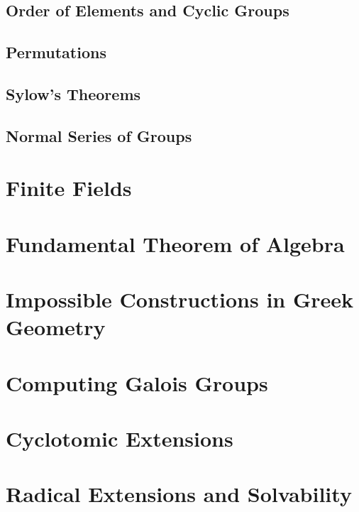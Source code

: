 \documentclass[oneside]{book}
\theoremstyle{lemmastyle}
\theoremstyle{definitionstyle}
\theoremstyle{exercisestyle}
\theoremstyle{claimstyle}
\newcommand{\<}{\langle}
\renewcommand{\>}{\rangle}
\begin{document}
        \section{Order of Elements and Cyclic Groups}
            
        
        \section{Permutations}
            
        
        \section{Sylow's Theorems}
            
            
        \section{Normal Series of Groups}
            
            
    \chapter{Finite Fields}
        
    
    \chapter{Fundamental Theorem of Algebra}
        
    
    \chapter{Impossible Constructions in Greek Geometry}
        
        
    \chapter{Computing Galois Groups}
        
    
    \chapter{Cyclotomic Extensions}
        

    \chapter{Radical Extensions and Solvability}
        

    
\end{document}
